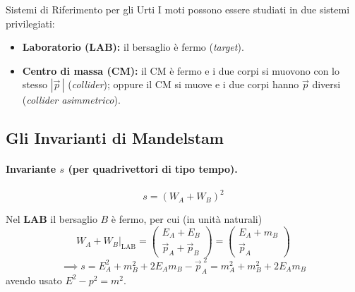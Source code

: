 \begin{definizione}{Sistemi di Riferimento per gli Urti}
I moti possono essere studiati in due sistemi privilegiati:
\begin{itemize}[leftmargin=1.4em]
    \item \textbf{Laboratorio (LAB):} il bersaglio è fermo (\emph{target}).
    \item \textbf{Centro di massa (CM):} il CM è fermo e i due corpi si muovono con lo stesso $|\vec{p}\,|$ (\emph{collider}); oppure il CM si muove e i due corpi hanno $\vec{p}$ diversi (\emph{collider asimmetrico}).
\end{itemize}
\end{definizione}

\subsection{Gli Invarianti di Mandelstam}

\paragraph{Invariante $s$ (per quadrivettori di tipo tempo).}
\begin{equation}
    s = (W_A + W_B)^2
\end{equation}

Nel \textbf{LAB} il bersaglio $B$ è fermo, per cui (in unità naturali)
\begin{equation*}
    W_A + W_B \big|_{\text{LAB}} = \begin{pmatrix} E_A + E_B \\ \vec{p}_A + \vec{p}_B \end{pmatrix}
    = \begin{pmatrix} E_A + m_B \\ \vec{p}_A \end{pmatrix}
\end{equation*}
\begin{equation}
    \implies s = E_A^2 + m_B^2 + 2E_A m_B - \vec{p}_A^{\;2}
    = m_A^2 + m_B^2 + 2E_A m_B
\end{equation}
avendo usato $E^2 - p^2 = m^2$.


